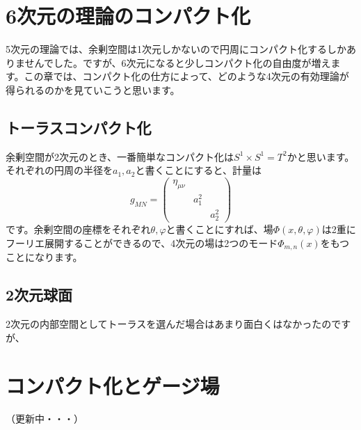 \documentclass[unicode,a4paper,11pt]{ltjsarticle}
\begin{document}
\section{6次元の理論のコンパクト化}

5次元の理論では、余剰空間は1次元しかないので円周にコンパクト化するしかありませんでした。ですが、6次元になると少しコンパクト化の自由度が増えます。この章では、コンパクト化の仕方によって、どのような4次元の有効理論が得られるのかを見ていこうと思います。

\subsection{トーラスコンパクト化}

余剰空間が2次元のとき、一番簡単なコンパクト化は$S^{1}\times S^{1}=T^{2}$かと思います。それぞれの円周の半径を$a_{1},a_{2}$と書くことにすると、計量は
\begin{equation}
   g_{MN}
   =
   \begin{pmatrix}
      \eta_{\mu\nu} &         &         \\
                    & a_{1}^2 &         \\
                    &         & a_{2}^2
   \end{pmatrix}
\end{equation}
です。余剰空間の座標をそれぞれ$\theta,\varphi$と書くことにすれば、場$\Phi(x,\theta,\varphi)$は2重にフーリエ展開することができるので、4次元の場は2つのモード$\Phi_{m,n}(x)$をもつことになります。


\subsection{2次元球面}

2次元の内部空間としてトーラスを選んだ場合はあまり面白くはなかったのですが、



















\clearpage

\section{コンパクト化とゲージ場}

（更新中・・・）
\end{document}
